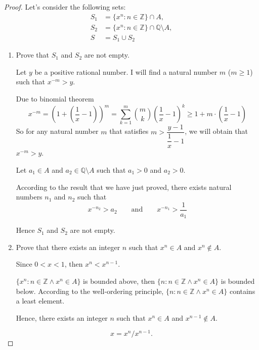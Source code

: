 \begin{proof}
    Let's consider the following sets:
    \[
        \begin{split}
            S_{1} & = \{ {x}^{n} : n\in\mathbb{Z} \} \cap A, \\
            S_{2} & = \{ {x}^{n} : n\in\mathbb{Z} \} \cap \mathbb{Q}\setminus A, \\
            S & = S_{1}\cup S_{2}
        \end{split}
    \]
    \begin{enumerate}[label={\textbf{Step \arabic*.}},itemindent=1cm]
        \item Prove that $S_{1}$ and $S_{2}$ are not empty.

              Let $y$ be a positive rational number. I will find a natural number $m$ ($m\ge 1$) such that $x^{-m} > y$.

              Due to binomial theorem
              \[
                  x^{-m} = {\left(1 + \left(\frac{1}{x} - 1\right)\right)}^{m} = \sum^{m}_{k=1}\binom{m}{k}{\left(\frac{1}{x} - 1\right)}^{k} \ge 1 + m\cdot\left(\frac{1}{x} - 1\right)
              \]
              So for any natural number $m$ that satisfies $m > \dfrac{y - 1}{\dfrac{1}{x} - 1}$, we will obtain that $x^{-m} > y$.

              Let $a_{1}\in A$ and $a_{2}\in\mathbb{Q}\setminus A$ such that $a_{1} > 0$ and $a_{2} > 0$.

              According to the result that we have just proved, there exists natural numbers $n_{1}$ and $n_{2}$ such that
              \[
                  x^{-{n}_{2}} > a_{2}\qquad\text{and}\qquad x^{-{n}_{1}} > \frac{1}{a_{1}}
              \]

              Hence $S_{1}$ and $S_{2}$ are not empty.

        \item Prove that there exists an integer $n$ such that $x^{n}\in A$ and $x^{n}\notin A$.

              Since $0 < x < 1$, then ${x}^{n} < {x}^{n-1}$.

              $\{ {x}^{n} : n\in\mathbb{Z}\land {x}^{n}\in A \}$ is bounded above, then $\{ n : n\in\mathbb{Z}\land {x}^{n}\in A \}$ is bounded below. According to the well-ordering principle, $\{ n : n\in\mathbb{Z}\land {x}^{n}\in A \}$ contains a least element.

              Hence, there exists an integer $n$ such that ${x}^{n}\in A$ and ${x}^{n-1}\notin A$.
    \end{enumerate}

    \[
        x = {x^{n}} / {x^{n-1}}.
    \]


\end{proof}
